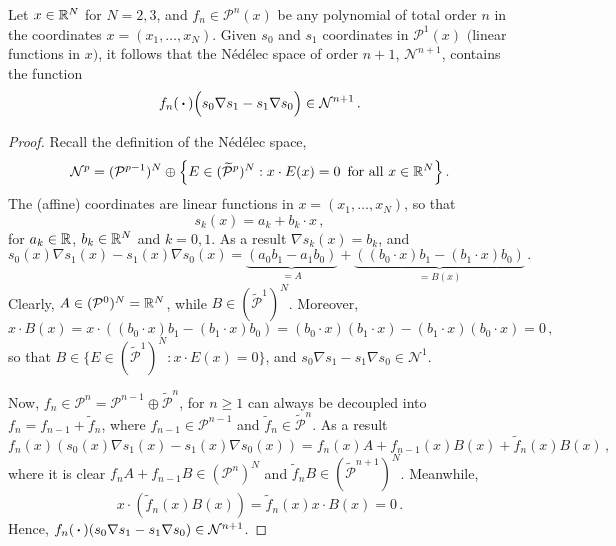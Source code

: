 \begin{lemma}
\label{lemma:curl}
Let $x\in\mathbb{R}^N$ for $N=2,3$, and $f_n\in\mathcal{P}^n(x)$ be any polynomial of total order $n$ in the coordinates $x=(x_1,\ldots,x_N)$. Given $s_0$ and $s_1$ coordinates in $\mathcal{P}^1(x)$ $($linear functions in $x$$)$, it follows that the N\'ed\'elec space of order $n+1$, $\mathcal{N}^{n+1}$, contains the function
\begin{equation*}
	f_n(\,\boldsymbol{\cdot}\,)\Big(s_0\nabla s_1-s_1\nabla s_0\Big)\in\mathcal{N}^{n+1}\,.
\end{equation*}
\end{lemma}
\begin{proof}
Recall the definition of the N\'ed\'elec space,
\begin{equation*}
	\mathcal{N}^p=(\mathcal{P}^{p-1})^N\oplus\Big\{E\in(\widetilde{\mathcal{P}}^{p})^N: x\cdot E(x)=0\,\text{ for all } 
		x\in\mathbb{R}^N\Big\}\,.
\end{equation*}
The (affine) coordinates are linear functions in $x=(x_1,\ldots,x_N)$, so that
\begin{equation*}
	s_k(x)=a_k+b_k\cdot x\,,
\end{equation*}
for $a_k\in\mathbb{R}$, $b_k\in\mathbb{R}^N$ and $k=0,1$. As a result $\nabla s_k(x)=b_k$, and
\begin{equation*}
	s_0(x)\nabla s_1(x)-s_1(x)\nabla s_0(x)=\underbrace{(a_0b_1-a_1b_0)}_{=A}+\underbrace{((b_0\cdot x)b_1-(b_1\cdot x)b_0)}_{=B(x)}\,.
\end{equation*}
Clearly, $A\in(\mathcal{P}^0)^N=\mathbb{R}^N$, while $B\in(\tilde{\mathcal{P}}^1)^N$. Moreover,
\begin{equation*}
	x\cdot B(x)=x\cdot((b_0\cdot x)b_1-(b_1\cdot x)b_0)=(b_0\cdot x)(b_1\cdot x)-(b_1\cdot x)(b_0\cdot x)=0\,,
\end{equation*}
so that $B\in\{E\in(\tilde{\mathcal{P}}^{1})^N: x\cdot E(x)=0\}$, and $s_0\nabla s_1-s_1\nabla s_0\in\mathcal{N}^1$.

Now, $f_n\in\mathcal{P}^n=\mathcal{P}^{n-1}\oplus\tilde{\mathcal{P}}^n$, for $n\geq1$ can always be decoupled into $f_n=f_{n-1}+\tilde{f}_n$, where $f_{n-1}\in\mathcal{P}^{n-1}$ and $\tilde{f}_n\in\tilde{\mathcal{P}}^n$. As a result
\begin{equation*}
	f_n(x)(s_0(x)\nabla s_1(x)-s_1(x)\nabla s_0(x))=f_n(x)A+f_{n-1}(x)B(x)+\tilde{f}_n(x)B(x)\,,
\end{equation*}
where it is clear $f_{n}A+f_{n-1}B\in(\mathcal{P}^n)^N$ and $\tilde{f}_nB\in(\tilde{\mathcal{P}}^{n+1})^N$. Meanwhile, 
\begin{equation*}
x\cdot(\tilde{f}_n(x)B(x))=\tilde{f}_n(x)x\cdot B(x)=0\,.
\end{equation*}
Hence, $f_n(\,\boldsymbol{\cdot}\,)(s_0\nabla s_1-s_1\nabla s_0)\in\mathcal{N}^{n+1}$.
\end{proof}



